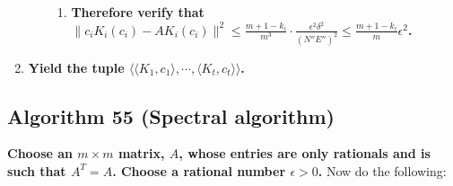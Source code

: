 \documentclass[twocolumn]{article}
\begin{document}
\begin{enumerate}
\begin{enumerate}
\begin{enumerate}
					\item \textbf{Therefore verify that $\lVert c_iK_i(c_i)-AK_i(c_i)\rVert^2\le\frac{m+1-k_i}{m^3}\cdot\frac{\epsilon^2\delta^2}{(N''E'')^2}\le\frac{m+1-k_i}{m}\epsilon^2$.}
					\end{enumerate}
				\end{enumerate}
				\item \textbf{Yield the tuple $\langle\langle K_1,c_1\rangle,\cdots,\langle K_t,c_t\rangle\rangle$.}
			\end{enumerate}
		\subsection{Algorithm 55 (Spectral algorithm)}\label{sec:algorithm 55}
			\textbf{Choose an $m\times m$ matrix, $A$, whose entries are only rationals and is such that $A^T=A$. Choose a rational number $\epsilon>0$.} Now do the following:
\end{document}
